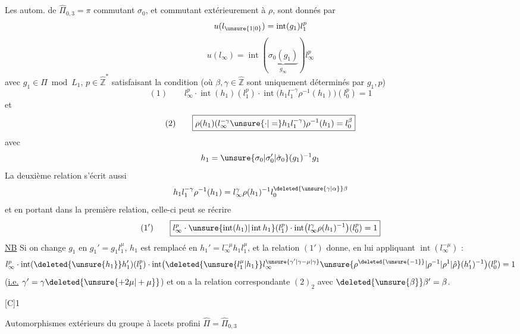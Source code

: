 
Les autom.  de $\hat\Pi_{0,3}=\pi$ commutant  $\sigma_0$, et commutant extérieurement à $\rho$, sont donnés par
\[
u(l_{\unsure{1|0}})=\operatorname{int}(g_1)l_1^{p}
\]
\[
u(l_\infty)=\operatorname{int}(\underbrace{\sigma_0(g_1)}_{g_\infty})l_\infty^{p}
\]
avec $g_1\in\Pi\bmod L_1$, $p\in\hat{\mathbb Z}^{*}$ satisfaisant la condition (où $\beta,\gamma\in\hat{\mathbb Z}$ sont uniquement déterminés par $g_1,p$)
\[
(1)\qquad\boxed{l_\infty^{p}\cdot\operatorname{int}(h_1)(l_1^{p})\cdot\operatorname{int}\bigl(h_1l_1^{-\gamma}\rho^{-1}(h_1)\bigr)(l_0^{p})=1}
\]
et
\[
(2)\qquad\boxed{\rho(h_1)(l_\infty^{-\gamma}\unsure{\cdot|=} h_1l_1^{-\gamma})\rho^{-1}(h_1)=l_0^\beta}
\]
avec
\[
h_1=\unsure{\sigma_0|\sigma_0'|\dot\sigma_0}(g_1)^{-1}g_1
\]
La deuxième relation s'écrit aussi
\[
h_1l_1^{-\gamma}\rho^{-1}(h_1)=l_\infty^\gamma\rho(h_1)^{-1}l_0^{\deleted{\unsure{\gamma|\alpha}}\beta}
\]
et en portant dans la première relation, celle-ci peut se récrire
\[
(1')\qquad\boxed{l_\infty^{p}\cdot\unsure{\operatorname{int}(h_1)|\operatorname{int}h_1}(l_1^{p})\cdot\operatorname{int}\bigl(l_\infty^\gamma\rho(h_1)^{-1}\bigr)(l_0^{p})=1}
\]
\uline{NB} Si on change $g_1$ en $g_1'=g_1l_1^\mu$, $h_1$ est remplacé en $h_1'=l_\infty^{-\mu}h_1l_1^\mu$, et la relation $(1')$ donne, en lui appliquant $\operatorname{int}(l_\infty^{-\mu})$ :
\[
l_\infty^{p}\cdot\operatorname{int}(\deleted{\unsure{h_1}}h_1')(l_1^{p})\cdot\operatorname{int}\bigl(\deleted{\unsure{l_1^\mu|h_1}}l_\infty^{\unsure{\gamma'|\gamma-\mu|\gamma}}\unsure{\rho^{\deleted{\unsure{-1}}}|\rho^{-1}|\rho^1|\hat\rho}(h_1')^{-1}\bigr)(l_0^{p})=1
\]
(\uline{i.e.} \uline{$\gamma'=\gamma\deleted{\unsure{+2\mu|+\mu}}$}) et on a la relation correspondante  $(2)_2$ avec $\deleted{\unsure{\beta}}\beta'=\beta$.

[C]\qquad\textcircled{1}\qquad{}

Automorphismes extérieurs du groupe à lacets  profini $\hat\Pi=\hat\Pi_{0,3}$
\margin{$\unsure{\partial|\delta}$}

